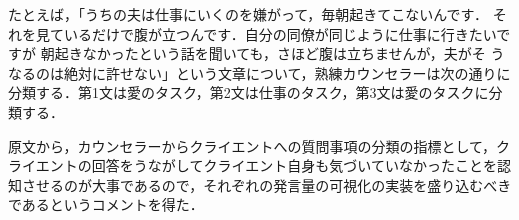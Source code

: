 \documentclass[shuuron]{kuee}
\begin{document}
たとえば，「うちの夫は仕事にいくのを嫌がって，毎朝起きてこないんです．
それを見ているだけで腹が立つんです．自分の同僚が同じように仕事に行きたいですが
朝起きなかったという話を聞いても，さほど腹は立ちませんが，夫がそ
うなるのは絶対に許せない」という文章について，熟練カウンセラーは次の通りに分類する．第1文は愛のタスク，第2文は仕事のタスク，第3文は愛のタスクに分類する．%




原文から，カウンセラーからクライエントへの質問事項の分類の指標として，クライエントの回答をうながしてクライエント自身も気づいていなかったことを認知させるのが大事であるので，それぞれの発言量の可視化の実装を盛り込むべきであるというコメントを得た．
\end{document}
